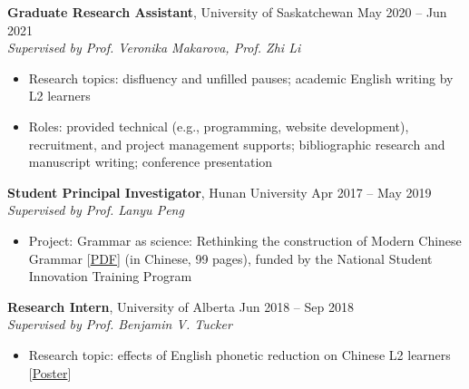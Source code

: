 \documentclass[a4paper, 11pt]{article}  %
\begin{document}
\textbf{Graduate Research Assistant}, University of Saskatchewan \hfill May 2020 – Jun 2021 \vspace{3pt} \\ 
\emph{Supervised by Prof. Veronika Makarova, Prof. Zhi Li}

\begin{itemize}
	\itemsep0em 
	
	\item{Research topics: disfluency and unfilled pauses; academic English writing by L2 learners}
	\item{Roles: provided technical (e.g., programming, website development), recruitment, and project management supports; bibliographic research and manuscript writing; conference presentation}
	
\end{itemize}

\vspace{11pt}

\noindent
\textbf{Student Principal Investigator}, Hunan University \hfill Apr 2017 – May 2019 \vspace{3pt} \\ 
\emph{Supervised by Prof. Lanyu Peng}
\begin{itemize}
	\itemsep0em 
	
	\item{Project: Grammar as science: Rethinking the construction of Modern Chinese Grammar [\href{https://drive.google.com/file/d/1h_u2THzdFSRTRMPgM2UDXj7O_dGkJAN3/view}{PDF}] (in Chinese, 99 pages), funded by the National Student Innovation Training Program}
	
\end{itemize}

\vspace{11pt}

\noindent
\textbf{Research Intern}, University of Alberta \hfill Jun 2018 – Sep 2018 \vspace{3pt} \\ 
\emph{Supervised by Prof. Benjamin V. Tucker}
\begin{itemize}
	\itemsep0em 
	
	\item{Research topic: effects of English phonetic reduction on Chinese L2 learners [\href{https://drive.google.com/file/d/1Pq59XVx5zYgCazE93btu9G8RI6Mk_tVC/view}{Poster}]}
	
\end{itemize}

\end{document}
